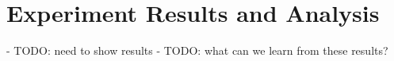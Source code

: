 \section{Experiment Results and Analysis}

- TODO: need to show results
- TODO: what can we learn from these results?